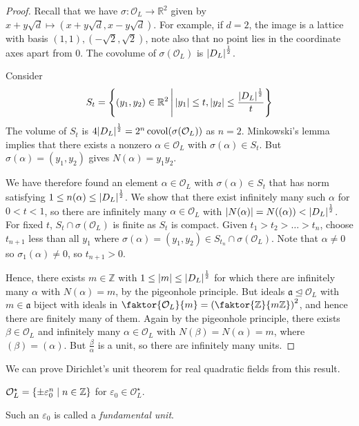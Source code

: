 \begin{proof}
    Recall that we have \( \sigma \colon \mathcal O_L \to \mathbb R^2 \) given by \( x + y\sqrt{d} \mapsto (x + y \sqrt{d}, x - y \sqrt{d}) \).
    For example, if \( d = 2 \), the image is a lattice with basis \( (1,1), (-\sqrt{2}, \sqrt{2}) \), note also that no point lies in the coordinate axes apart from 0.
    The covolume of \( \sigma(\mathcal O_L) \) is \( \abs{D_L}^{\frac{1}{2}} \).

    Consider
    \[ S_t = \qty{(y_1, y_2) \in \mathbb R^2 \,\middle|\,\abs{y_1} \leq t, \abs{y_2} \leq \frac{\abs{D_L}^{\frac{1}{2}}}{t}} \]
    The volume of \( S_t \) is \( 4\abs{D_L}^{\frac{1}{2}} = 2^n \operatorname{covol}(\sigma(\mathcal O_L)) \) as \( n = 2 \).
    Minkowski's lemma implies that there exists a nonzero \( \alpha \in \mathcal O_L \) with \( \sigma(\alpha) \in S_t \).
    But \( \sigma(\alpha) = (y_1, y_2) \) gives \( N(\alpha) = y_1 y_2 \).

    We have therefore found an element \( \alpha \in \mathcal O_L \) with \( \sigma(\alpha) \in S_t \) that has norm satisfying \( 1 \leq n(\alpha) \leq \abs{D_L}^{\frac{1}{2}} \).
    We show that there exist infinitely many such \( \alpha \) for \( 0 < t < 1 \), so there are infinitely many \( \alpha \in \mathcal O_L \) with \( \abs{N(\alpha)} = N((\alpha)) < \abs{D_L}^{\frac{1}{2}} \).
    For fixed \( t \), \( S_t \cap \sigma(\mathcal O_L) \) is finite as \( S_t \) is compact.
    Given \( t_1 > t_2 > \dots > t_n \), choose \( t_{n+1} \) less than all \( y_1 \) where \( \sigma(\alpha) = (y_1, y_2) \in S_{t_n} \cap \sigma(\mathcal O_L) \).
    Note that \( \alpha \neq 0 \) so \( \sigma_1(\alpha) \neq 0 \), so \( t_{n+1} > 0 \).

    Hence, there exists \( m \in \mathbb Z \) with \( 1 \leq \abs{m} \leq \abs{D_L}^{\frac{1}{2}} \) for which there are infinitely many \( \alpha \) with \( N(\alpha) = m \), by the pigeonhole principle.
    But ideals \( \mathfrak a \trianglelefteq \mathcal O_L \) with \( m \in \mathfrak a \) biject with ideals in \( \faktor{\mathcal O_L}{m} = \qty(\faktor{\mathbb Z}{m\mathbb Z})^2 \), and hence there are finitely many of them.
    Again by the pigeonhole principle, there exists \( \beta \in \mathcal O_L \) and infinitely many \( \alpha \in \mathcal O_L \) with \( N(\beta) = N(\alpha) = m \), where \( (\beta) = (\alpha) \).
    But \( \frac{\beta}{\alpha} \) is a unit, so there are infinitely many units.
\end{proof}
We can prove Dirichlet's unit theorem for real quadratic fields from this result.
\begin{corollary}
    \( \mathcal O_L^\star = \qty{\pm \varepsilon_0^n \mid n \in \mathbb Z} \) for \( \varepsilon_0 \in \mathcal O_L^\star \).
\end{corollary}
Such an \( \varepsilon_0 \) is called a \emph{fundamental unit}.
